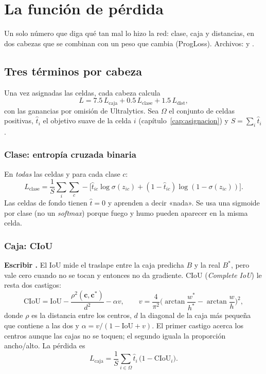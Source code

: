 \chapter{La función de pérdida}
\label{cap:perdida}

\begin{enpocas}
Un solo número que diga qué tan mal lo hizo la red: clase, caja y distancias, en
dos cabezas que se combinan con un peso que cambia (ProgLoss). Archivos:
 y .
\end{enpocas}

\section{Tres términos por cabeza}

Una vez asignadas las celdas, cada cabeza calcula
\begin{equation}
L = 7.5\,L_{\text{caja}} + 0.5\,L_{\text{clase}} + 1.5\,L_{\text{dist}},
\end{equation}
con las ganancias por omisión de Ultralytics. Sea $\Omega$ el conjunto de celdas
positivas, $\hat t_i$ el objetivo suave de la celda $i$
(capítulo~\ref{cap:asignacion}) y $S = \sum_i \hat t_i$.

\subsection{Clase: entropía cruzada binaria}
En \emph{todas} las celdas y para cada clase $c$:
\begin{equation}
L_{\text{clase}} = \frac{1}{S}\sum_{i}\sum_{c} -\big[\hat t_{ic}\log\sigma(z_{ic})
+ (1-\hat t_{ic})\log(1-\sigma(z_{ic}))\big].
\end{equation}
Las celdas de fondo tienen $\hat t = 0$ y aprenden a decir «nada». Se usa una
sigmoide por clase (no un \emph{softmax}) porque fuego y humo pueden aparecer en
la misma celda.

\subsection{Caja: CIoU}
 \textbf{Escribir .}
El IoU mide el traslape entre la caja predicha $B$ y la real $B^\ast$, pero vale
cero cuando no se tocan y entonces no da gradiente. CIoU (\emph{Complete IoU}) le
resta dos castigos:
\begin{equation}
\mathrm{CIoU} = \mathrm{IoU} - \frac{\rho^2(\mathbf{c},\mathbf{c}^\ast)}{d^2} - \alpha v,
\qquad v = \frac{4}{\pi^2}\Big(\arctan\frac{w^\ast}{h^\ast} - \arctan\frac{w}{h}\Big)^2,
\end{equation}
donde $\rho$ es la distancia entre los centros, $d$ la diagonal de la caja más
pequeña que contiene a las dos y $\alpha = v/(1 - \mathrm{IoU} + v)$. El primer
castigo acerca los centros aunque las cajas no se toquen; el segundo iguala la
proporción ancho/alto. La pérdida es
\begin{equation}
L_{\text{caja}} = \frac{1}{S}\sum_{i\in\Omega}\hat t_i\,\big(1-\mathrm{CIoU}_i\big).
\end{equation}

